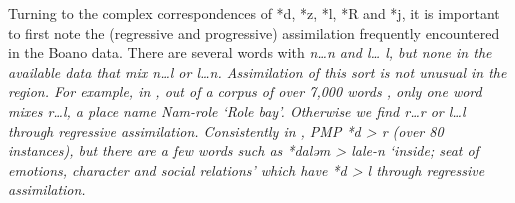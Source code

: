 
Turning to the complex correspondences of *d,
*z, *l, *R and *j, it is important to first note the (regressive
and progressive) assimilation frequently encountered in the Boano data.
There are several words with \it{n{\ldots}n}
and \it{l{\ldots} l}, but none in the available data that mix
\it{n{\ldots}l} or \it{l{\ldots}n}.
Assimilation of this sort is not unusual in the region.
For example, in ,
out of a corpus of over 7,000 words \citep{GrimesGrimes2020},
only one word mixes \it{r{\ldots}l},
a place name \it{Nam-role} ‘Role bay’.
Otherwise we find \it{r{\ldots}r} or \it{l{\ldots}l} through regressive assimilation.
Consistently in , PMP *d > \it{r} (over 80 instances),
but there are a few words such as *daləm > \it{lale-n} ‘inside;
seat of emotions, character and social relations’ which have *d > \it{l} through regressive assimilation.

